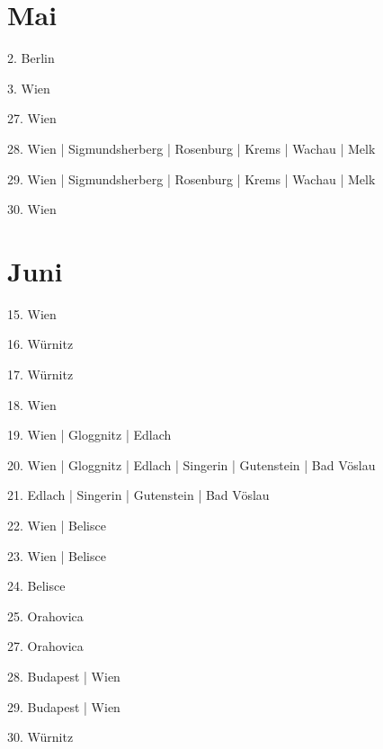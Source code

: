 \documentclass[twoside=false,titlepage=false,open=any, parskip=never, fontsize=10pt, headings=small, chapterprefix=false, appendixprefix=false, DIV=15]{scrbook}
\begin{document}
\begin{multicols}{3}
            \section*{Mai}
            2. Berlin\par
            3. Wien\par
            27. Wien\par
            28. Wien | Sigmundsherberg | Rosenburg | Krems | Wachau | Melk\par
            29. Wien | Sigmundsherberg | Rosenburg | Krems | Wachau | Melk\par
            30. Wien\par
            \section*{Juni}
            15. Wien\par
            16. Würnitz\par
            17. Würnitz\par
            18. Wien\par
            19. Wien | Gloggnitz | Edlach\par
            20. Wien | Gloggnitz | Edlach | Singerin | Gutenstein | Bad Vöslau\par
            21. Edlach | Singerin | Gutenstein | Bad Vöslau\par
            22. Wien | Belisce\par
            23. Wien | Belisce\par
            24. Belisce\par
            25. Orahovica\par
            27. Orahovica\par
            28. Budapest | Wien\par
            29. Budapest | Wien\par
            30. Würnitz\par

\end{multicols}
\end{document}

